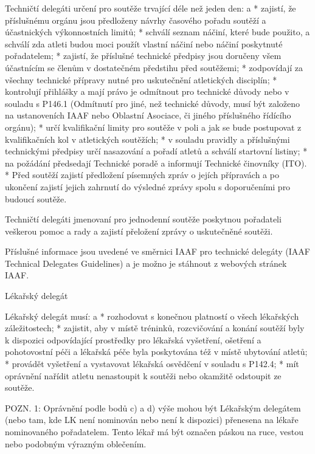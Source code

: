 Techničtí delegáti určení pro soutěže trvající déle než jeden den:
\begitems \style a
* zajistí, že příslušnému orgánu jsou předloženy návrhy časového pořadu soutěží a účastnických výkonnostních limitů;
* schválí seznam náčiní, které bude použito, a schválí zda atleti budou moci použít vlastní náčiní nebo náčiní poskytnuté pořadatelem;
* zajistí, že příslušné technické předpisy jsou doručeny všem účastnícím se členům v dostatečném předstihu před soutěžemi;
* zodpovídají za všechny technické přípravy nutné pro uskutečnění atletických disciplín;
* kontrolují přihlášky a mají právo je odmítnout pro technické důvody nebo v souladu s P146.1 (Odmítnutí pro jiné, než technické důvody, musí být založeno na ustanoveních IAAF nebo Oblastní Asociace, či jiného příslušného řídícího orgánu);
* určí kvalifikační limity pro soutěže v poli a jak se bude postupovat z kvalifikačních kol v atletických soutěžích;
* v souladu pravidly a příslušnými technickými předpisy určí nasazování a pořadí atletů a schválí startovní listiny;
* na požádání předsedají Technické poradě a informují Technické činovníky (ITO).
* Před soutěží zajistí předložení písemných zpráv o jejích přípravách a po ukončení zajistí jejich zahrnutí do výsledné zprávy spolu s doporučeními pro budoucí soutěže.
\enditems

Techničtí delegáti jmenovaní pro jednodenní soutěže poskytnou pořadateli veškerou pomoc a rady a zajistí přeložení zprávy o uskutečněné soutěži.

Příslušné informace jsou uvedené ve směrnici IAAF pro technické delegáty (IAAF Technical Delegates Guidelines) a je možno je stáhnout z webových stránek IAAF.

\secc Lékařský delegát

Lékařský delegát musí:
\begitems \style a
* rozhodovat s konečnou platností o všech lékařských záležitostech;
* zajistit, aby v místě tréninků, rozcvičování a konání soutěží byly k dispozici odpovídající prostředky pro lékařská vyšetření, ošetření a pohotovostní péči a lékařská péče byla poskytována též v místě ubytování atletů;
* provádět vyšetření a vystavovat lékařská osvědčení v souladu s P142.4;
* mít oprávnění nařídit atletu nenastoupit k soutěži nebo okamžitě odstoupit ze soutěže.
\enditems

POZN. 1: Oprávnění podle bodů c) a d) výše mohou být Lékařským delegátem (nebo tam, kde LK není nominován nebo není k dispozici) přenesena na lékaře nominovaného pořadatelem. Tento lékař má být označen páskou na ruce, vestou nebo podobným výrazným oblečením.


